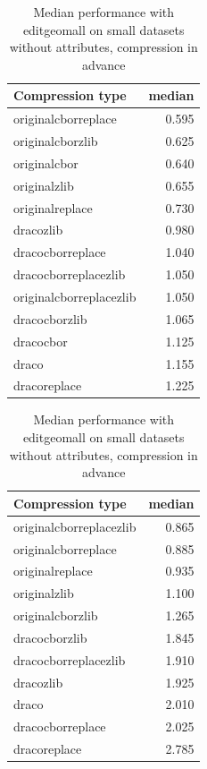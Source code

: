 \begin{table}[!h]
    \begin{minipage}{.5\linewidth}
      \caption{
Median performance with editgeomall on small datasets, compression in advance}
\centering

\begin{tabular}{|l|r|}
\hline
Compression type & median\\
\hline
originalcborreplace & 0.595\\
\hline
originalcborzlib & 0.625\\
\hline
originalcbor & 0.640\\
\hline
originalzlib & 0.655\\
\hline
originalreplace & 0.730\\
\hline
dracozlib & 0.980\\
\hline
dracocborreplace & 1.040\\
\hline
dracocborreplacezlib & 1.050\\
\hline
originalcborreplacezlib & 1.050\\
\hline
dracocborzlib & 1.065\\
\hline
dracocbor & 1.125\\
\hline
draco & 1.155\\
\hline
dracoreplace & 1.225\\
\hline
\end{tabular}
\end{minipage}%
    \begin{minipage}{.5\linewidth}
      \centering
        \caption{
Median performance with editgeomall on small datasets without attributes, compression in advance}

\begin{tabular}{|l|r|}
\hline
Compression type & median\\
\hline
originalcborreplacezlib & 0.865\\
\hline
originalcborreplace & 0.885\\
\hline
originalreplace & 0.935\\
\hline
originalzlib & 1.100\\
\hline
originalcborzlib & 1.265\\
\hline
dracocborzlib & 1.845\\
\hline
dracocborreplacezlib & 1.910\\
\hline
dracozlib & 1.925\\
\hline
draco & 2.010\\
\hline
dracocborreplace & 2.025\\
\hline
dracoreplace & 2.785\\
\hline
\end{tabular}
\end{minipage} 
\end{table}

